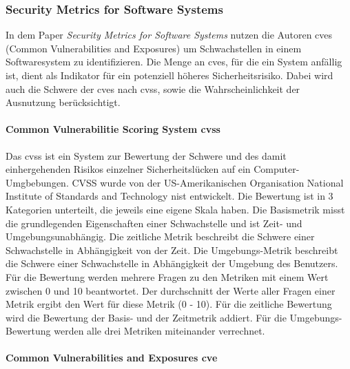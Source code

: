 \documentclass[12pt, a4paper, ngerman]{article}
\begin{document}
\subsubsection{Security Metrics for Software Systems~\cite{Wang_Wang_Guo_Xia_2009}}

In dem Paper \emph{Security Metrics for Software Systems} nutzen die Autoren \ac{cve}s (Common Vulnerabilities and Exposures) 
um Schwachstellen in einem Softwaresystem zu identifizieren. 
Die Menge an \ac{cve}s, für die ein System anfällig ist, dient als Indikator für ein potenziell höheres Sicherheitsrisiko.
Dabei wird auch die Schwere der \ac{cve}s nach \ac{cvss}, sowie die Wahrscheinlichkeit der Ausnutzung berücksichtigt.

\paragraph{Common Vulnerabilitie Scoring System \acs{cvss}}

Das \ac{cvss} ist ein System zur Bewertung der Schwere und 
des damit einhergehenden Risikos einzelner Sicherheitslücken auf ein Computer-Umgbebungen.
CVSS wurde von der US-Amerikanischen Organisation National Institute of Standards and Technology \ac{nist} entwickelt. 
Die Bewertung ist in  3 Kategorien unterteilt, die jeweils eine eigene Skala haben.
Die Basismetrik misst die grundlegenden Eigenschaften einer Schwachstelle und ist Zeit- und Umgebungsunabhängig.
Die zeitliche Metrik beschreibt die Schwere einer Schwachstelle in Abhängigkeit von der Zeit.
Die Umgebungs-Metrik beschreibt die Schwere einer Schwachstelle in Abhängigkeit der Umgebung des Benutzers.
Für die Bewertung werden mehrere Fragen zu den Metriken mit einem Wert zwischen 0 und 10 beantwortet.
Der durchschnitt der Werte aller Fragen einer Metrik ergibt den Wert für diese Metrik (0 - 10).
Für die zeitliche Bewertung wird die Bewertung der Basis- und der Zeitmetrik addiert.
Für die Umgebungs-Bewertung werden alle drei Metriken miteinander verrechnet.

\paragraph{Common Vulnerabilities and Exposures \acs{cve}}
\end{document}
